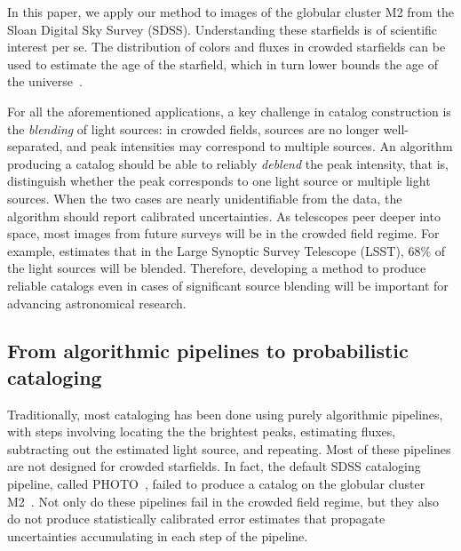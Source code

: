 In this paper, we apply our method to images of the globular cluster M2 from the Sloan Digital Sky Survey (SDSS). 
Understanding these starfields is of scientific interest per se. The distribution
of colors and fluxes in crowded starfields 
can be used to estimate the age 
of the starfield, which in turn lower bounds the 
age of the universe~\cite{Isochrome_fitting}. 

For all the aforementioned applications, a key challenge
in catalog construction is the {\itshape blending} of light sources: in crowded fields, sources are no longer well-separated, and peak intensities may correspond to multiple sources. An algorithm producing a catalog should be able to reliably {\itshape deblend} the peak intensity, that is, distinguish whether the peak corresponds to one light source or 
multiple light sources. When the two cases are nearly unidentifiable from the data, the algorithm should 
report calibrated uncertainties. As telescopes peer deeper into space, most images from future surveys will be in the crowded field regime. 
For example, \cite{Bosch_2017_LSST} estimates that in the Large Synoptic Survey Telescope (LSST), 68\% of the light sources will be blended. Therefore, developing a method to produce reliable catalogs even in cases of significant source blending will be important for advancing astronomical research. 

\subsection{From algorithmic pipelines to probabilistic cataloging}

Traditionally, most cataloging has been done using purely algorithmic pipelines, with steps involving locating the the brightest peaks, estimating fluxes, subtracting out the estimated light source, and repeating. Most of these pipelines are not designed for crowded starfields. 
In fact, the default SDSS cataloging pipeline, called PHOTO~\cite{lupton2001sdss}, failed to 
produce a catalog on 
the globular cluster M2~\cite{Portillo_2017}. 
Not only do these pipelines fail in the crowded field
regime, but they also do not produce statistically calibrated error estimates that propagate 
uncertainties accumulating in each step of the pipeline. 

